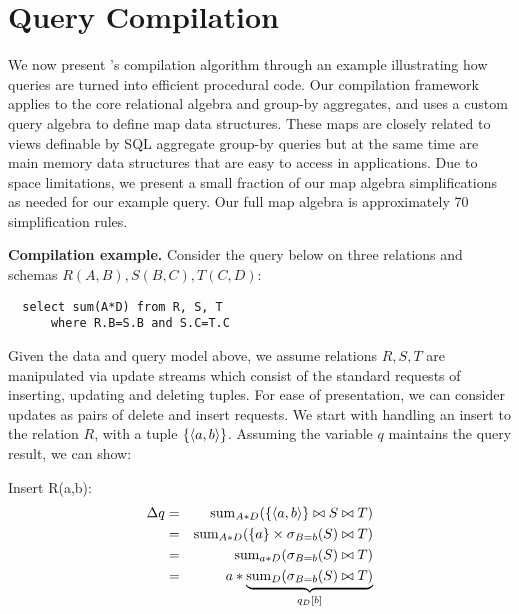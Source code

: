 
\section{Query Compilation}

\def\algsum{\mathrm{sum}}
\def\algagg{\mathrm{agg}}
\def\algtop{\mathrm{top}}
\def\algtopk{\mathrm{topk}}

\def\algsumr{\mbox{sumr}}
\def\algsumf{\mbox{sumf}}
\def\distinct{\mbox{distinct}}
\def\routerjoin{\bowtie\!=}

We now present \compiler's compilation algorithm through an example illustrating
how queries are turned into efficient procedural code. Our compilation framework
applies to the core relational algebra and group-by aggregates, and uses a custom
query algebra to define map data structures. These maps are closely related to
views definable by SQL aggregate group-by queries but at the same time are main
memory data structures that are easy to access in applications. Due to space
limitations, we present a small fraction of our map algebra simplifications as
needed for our example query. Our full map algebra is approximately 70
simplification rules.

\noindent\textbf{Compilation example.} Consider the query below on three
relations and schemas $R(A,B), S(B,C), T(C,D)$:

\vspace{-1mm}
\begin{verbatim}
  select sum(A*D) from R, S, T
      where R.B=S.B and S.C=T.C
\end{verbatim}
\vspace{-1mm}

Given the data and query model above, we assume relations $R, S, T$ are
manipulated via update streams which consist of the standard requests
of inserting, updating and deleting tuples. For ease of presentation, we can
consider updates as pairs of delete and insert requests. We start with handling
an insert to the relation $R$, with a tuple $\{{\langle a,b\rangle}\}$. Assuming
the variable $q$ maintains the query result, we can show:

\smallskip
Insert R(a,b):
\begin{eqnarray*}
\Delta q &=& \algsum_{A*D}(\{\tuple{a,b}\} \bowtie S \bowtie T)
\\ &=&
\algsum_{A*D}(\{a\} \times \sigma_{B=b}(S) \bowtie T)
\\ &=&
\algsum_{a*D}(\sigma_{B=b}(S) \bowtie T)
\\ &=&
a * \underbrace{\algsum_{D}(\sigma_{B=b}(S) \bowtie T)}_{q_D[b]}
\end{eqnarray*}

